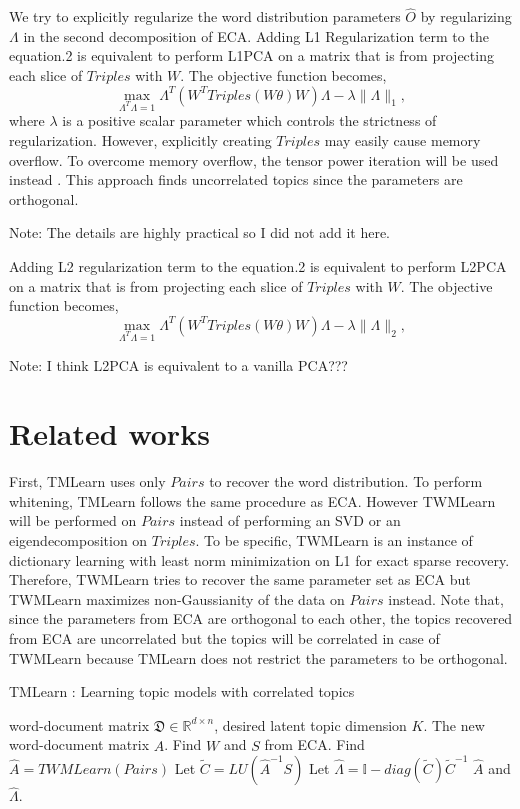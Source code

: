 \documentclass{article}
\begin{document}
We try to explicitly regularize the word distribution parameters $\hat{O}$ by regularizing $\Lambda$ in the second decomposition of ECA. Adding L1 Regularization term to the equation.2 is equivalent to perform L1PCA on a matrix that is from projecting each slice of $Triples$ with $W$. The objective function becomes,
\begin{equation}
\max_{\Lambda^T\Lambda = 1} \Lambda^T (W^T Triples (W\theta)W) \Lambda - \lambda\|\Lambda\|_1,
\end{equation}
where $\lambda$ is a positive scalar parameter which controls the strictness of regularization. However, explicitly creating $Triples$ may easily cause memory overflow. To overcome memory overflow, the tensor power iteration will be used instead \cite{anandkumar2012tensor}. This approach finds uncorrelated topics since the parameters are orthogonal. 

Note: The details are highly practical so I did not add it here. 

Adding L2 regularization term to the equation.2 is equivalent to perform L2PCA on a matrix that is from projecting each slice of $Triples$ with $W$. The objective function becomes,
\begin{equation}
\max_{\Lambda^T\Lambda = 1} \Lambda^T (W^T Triples (W\theta)W) \Lambda - \lambda\|\Lambda\|_2,
\end{equation}

Note: I think L2PCA is equivalent to a vanilla PCA???

\section{Related works}
First, TMLearn \cite{anandkumar2013learning} uses only $Pairs$ to recover the word distribution. To perform whitening, TMLearn follows the same procedure as ECA. However TWMLearn will be performed on $Pairs$ instead of performing an SVD or an eigendecomposition on $Triples$. To be specific, TWMLearn is an instance of dictionary learning with least norm minimization on L1 for exact sparse recovery. Therefore, TWMLearn tries to recover the same parameter set as ECA but TWMLearn maximizes non-Gaussianity of the data on $Pairs$ instead. Note that, since the parameters from ECA are orthogonal to each other, the topics recovered from ECA are uncorrelated but the topics will be correlated in case of TWMLearn because TMLearn does not restrict the parameters to be orthogonal.

\begin{algorithm}
\caption{TMLearn : Learning topic models with correlated topics}
\begin{algorithmic}[1]
\REQUIRE word-document matrix $ \mathfrak{D} \in \mathbb{R}^{d \times n}$, desired latent topic dimension $K$.
\ENSURE  The new word-document matrix $\hat{A}$.
\STATE  Find $W$ and $S$ from ECA.
\STATE  Find $\hat{A} = TWMLearn(Pairs)$
\STATE  Let $\tilde{C} = LU(\hat{A}^{-1}S)$
\STATE  Let $\hat{\Lambda} = \mathbb{I} - diag(\tilde{C})\tilde{C}^{-1}$
\RETURN $\hat{A}$ and $\hat{\Lambda}$.
\end{algorithmic}
\end{algorithm}
\end{document}
